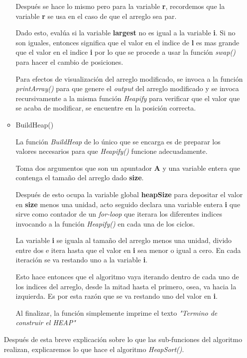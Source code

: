 \documentclass{article}
\begin{document}
\begin{itemize}
\begin{itemize}
					Después se hace lo mismo pero para la variable \textbf{r}, recordemos que la variable \textbf{r} se usa en el caso de que el arreglo sea par.
					
					Dado esto, evalúa si la variable \textbf{largest} no es igual a la variable \textbf{i}. Si no son iguales, entonces significa que el valor en el indice de \textbf{l} es mas grande que el valor en el indice \textbf{i} por lo que se procede a usar la función \emph{swap()} para hacer el cambio de posiciones.
					
					Para efectos de visualización del arreglo modificado, se invoca a la función \emph{printArray()} para que genere el \emph{output} del arreglo modificado y se invoca recursivamente a la misma función \emph{Heapify} para verificar que el valor que se acaba de modificar, se encuentre en la posición correcta.
					
					\item BuildHeap()
					
					La función \emph{BuildHeap} de lo único que se encarga es de preparar los valores necesarios para que \emph{Heapify()} funcione adecuadamente.
					
					Toma dos argumentos que son un apuntador \textbf{A} y una variable entera que contenga el tamaño del arreglo dado \textbf{size}.
					
					Después de esto ocupa la variable global \textbf{heapSize} para depositar el valor en \textbf{size} menos una unidad, acto seguido declara una variable entera \textbf{i} que sirve como contador de un \emph{for-loop} que iterara los diferentes indices invocando a la función \emph{Heapify()} en cada una de los ciclos.
					
					La variable \textbf{i} se iguala al tamaño del arreglo menos una unidad, divido entre dos e itera hasta que el valor en \textbf{i} sea menor o igual a cero. En cada iteración se va restando uno a la variable \textbf{i}.
					
					Esto hace entonces que el algoritmo vaya iterando dentro de cada uno de los indices del arreglo, desde la mitad hasta el primero, osea, va hacia la izquierda. Es por esta razón que se va restando uno del valor en \textbf{i}.
					
					Al finalizar, la función simplemente imprime el texto \emph{"Termino de construir el HEAP"}
					
				\end{itemize}
				
				Después de esta breve explicación sobre lo que las sub-funciones del algoritmo realizan, explicaremos lo que hace el algoritmo \emph{HeapSort()}.
				

\end{itemize}
\end{document}
